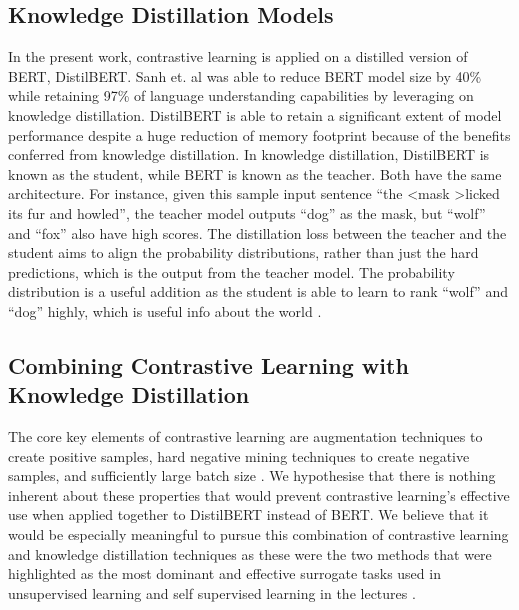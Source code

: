 \documentclass[10pt,twocolumn,letterpaper]{article}
\begin{document}
\subsection{Knowledge Distillation Models}

In the present work, contrastive learning is applied on a distilled version of BERT, DistilBERT. Sanh et. al \cite{1910.01108} was able to reduce BERT model size by 40\% while retaining 97\% of language understanding capabilities by leveraging on knowledge distillation. DistilBERT is able to retain a significant extent of model performance despite a huge reduction of memory footprint because of the benefits conferred from knowledge distillation. In knowledge distillation, DistilBERT is known as the student, while BERT is known as the teacher. Both have the same architecture. For instance, given this sample input sentence ``the \textless mask \textgreater licked its fur and howled'', the teacher model outputs ``dog'' as the mask, but ``wolf'' and ``fox'' also have high scores. The distillation loss between the teacher and the student aims to align the probability distributions, rather than just the hard predictions, which is the output from the teacher model. The probability distribution is a useful addition as the student is able to learn to rank ``wolf'' and ``dog'' highly, which is useful info about the world \cite{1910.01108}.

\subsection{Combining Contrastive Learning with Knowledge Distillation}

The core key elements of contrastive learning are augmentation techniques to create positive samples, hard negative mining techniques to create negative samples, and sufficiently large batch size \cite{2002.05709}. We hypothesise that there is nothing inherent about these properties that would prevent contrastive learning’s effective use when applied together to DistilBERT instead of BERT.  We believe that it would be especially meaningful to pursue this combination of contrastive learning and knowledge distillation techniques as these were the two methods that were highlighted as the most dominant and effective surrogate tasks used in unsupervised learning and self supervised learning in the lectures \cite{gatech}.
\end{document}
